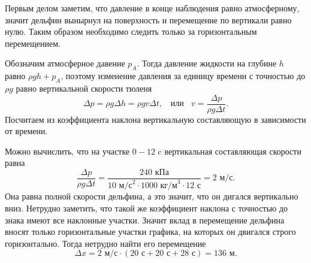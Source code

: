 	Первым делом заметим, что давление в конце наблюдения равно атмосферному, значит дельфин вынырнул на поверхность и перемещение по вертикали равно нулю. Таким образом необходимо следить только за горизонтальным перемещением.
	 
	Обозначим атмосферное давение $p_A$.
	Тогда давление жидкости на глубине $h$ равно $\rho g h + p_A$, поэтому изменение давления за единицу времени с точностью до $\rho g$ равно вертикальной скорости тюленя
\begin{equation}
	\Delta p = \rho g \Delta h = \rho g v \Delta t, \ \ \ \ \text{или} \ \ \ \ v = \frac{\Delta p}{\rho g \Delta t}.
\end{equation} 
Посчитаем из коэффициента наклона вертикальную составляющую в зависимости от времени.
	
	Можно вычислить, что на участке $0 - 12\text{ c}$ вертикальная составляющая скорости равна 
\begin{equation}
\frac{\Delta p}{\rho g \Delta t} = \frac{240\text{ кПа}}{10\text{ м/с}^2 \cdot 1000\text{ кг/м}^3 \cdot 12\text{ с}} = 2\text{ м/с}.
\end{equation} 
Она равна полной скорости дельфина, а это значит, что он дигался вертикально вниз. Нетрудно заметить, что такой же коэффициент наклона с точностью до знака имеют все наклонные участки. Значит вклад в перемещение дельфина вносят только горизонтальные участки графика, на которых он двигался строго горизонтально. Тогда нетрудно найти его перемещение
\begin{equation}
	\Delta x  = 2\text{ м/с} \cdot (20\text{ с} + 20\text{ с} + 28\text{ с}) = 136\text{ м}.
\end{equation} 

\ifgrade
\begin{grade-env}
\end{grade-env}
\fi
